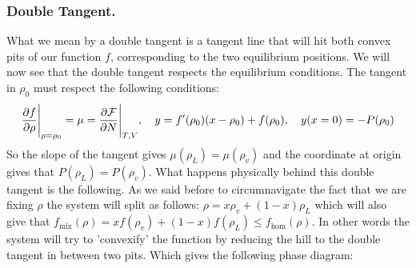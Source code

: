 \documentclass[10pt,a4paper]{book}
\begin{document}
\subsubsection{Double Tangent.}
What we mean by a double tangent is a tangent line that will hit both convex pits of our function $f$, corresponding to the two equilibrium positions. We will now see that the double tangent respects the equilibrium conditions. The tangent in $\rho_0$ must respect the following conditions:
\[
\pdv{f}{\rho}\Bigg|_{\rho = \rho_0} = \mu = \pdv{\mathcal{F}}{N}\Bigg|_{T,V}, \quad y = f'(\rho_0)(x - \rho_0) + f(\rho_0), \quad y(x = 0) = -P(\rho_0)
\]
So the slope of the tangent gives $\mu(\rho_L) = \mu(\rho_v)$ and the coordinate at origin gives that $P(\rho_L) = P(\rho_v)$. What happens physically behind this double tangent is the following. As we said before to circumnavigate the fact that we are fixing $\rho$ the system will split as follows: $\rho = x \rho_v + (1 - x) \rho_L$ which will also give that $f_\text{mix}(\rho) = x f(\rho_v) + (1 - x) f(\rho_L) \leq f_\text{hom}(\rho)$. In other words the system will try to 'convexify' the function by reducing the hill to the double tangent in between two pits. Which gives the following phase diagram:
\end{document}
